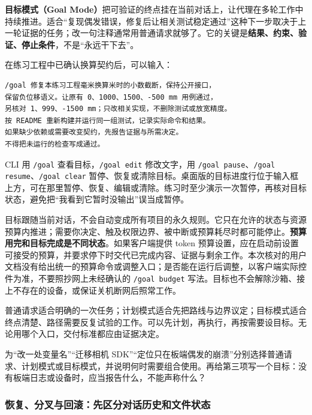 \textbf{目标模式（Goal Mode）}把可验证的终点挂在当前对话上，让代理在多轮工作中持续推进。适合“复现偶发错误，修复后让相关测试稳定通过”这种下一步取决于上一轮证据的任务；改一句注释通常用普通请求就够了。它的关键是\textbf{结果、约束、验证、停止条件}，不是“永远干下去”。

\begin{example}[给多轮修复设置有边界的目标]
在练习工程中已确认换算契约后，可以输入：
\begin{lstlisting}[language={}]
/goal 修复本练习工程毫米换算米时的小数截断，保持公开接口，
保留负位移语义。让原有 0、1000、1500、-500 mm 用例通过，
另核对 1、999、-1500 mm；只改相关实现，不删除测试或放宽精度。
按 README 重新构建并运行同一组测试，记录实际命令和结果。
如果缺少依赖或需要改变契约，先报告证据与所需决定。
不得把未运行的检查写成通过。
\end{lstlisting}
CLI 用 \texttt{/goal} 查看目标，\texttt{/goal edit} 修改文字，用 \texttt{/goal pause}、\texttt{/goal resume}、\texttt{/goal clear} 暂停、恢复或清除目标。桌面版的目标进度行位于输入框上方，可在那里暂停、恢复、编辑或清除。练习时至少演示一次暂停，再核对目标状态，避免把“我看到它暂时没输出”误当成暂停。
\end{example}

目标跟随当前对话，不会自动变成所有项目的永久规则。它只在允许的状态与资源预算内推进；需要你决定、触及权限边界、被中断或预算耗尽时都可能停止。\textbf{预算用完和目标完成是不同状态}。如果客户端提供 token 预算设置，应在启动前设置可接受的预算，并要求停下时交代已完成内容、证据与剩余工作。本次核对的用户文档没有给出统一的预算命令或调整入口；是否能在运行后调整，以客户端实际控件为准，不要照抄网上未经确认的 \texttt{/goal budget} 写法。目标也不会解除沙箱、接上不存在的设备，或保证关机断网后照常工作。

\begin{conclusion}
普通请求适合明确的一次任务；计划模式适合先把路线与边界议定；目标模式适合终点清楚、路径需要反复试验的工作。可以先计划，再执行，再按需要设目标。无论用哪个入口，交付标准都应由证据决定。
\end{conclusion}

\begin{exercise}\label{ex:ai-workflow-plan-goal}
为“改一处变量名”“迁移相机 SDK”“定位只在板端偶发的崩溃”分别选择普通请求、计划模式或目标模式，并说明何时需要组合使用。再给第三项写一个目标：没有板端日志或设备时，应当报告什么，不能声称什么？
\end{exercise}

\subsubsection{恢复、分叉与回滚：先区分对话历史和文件状态}

